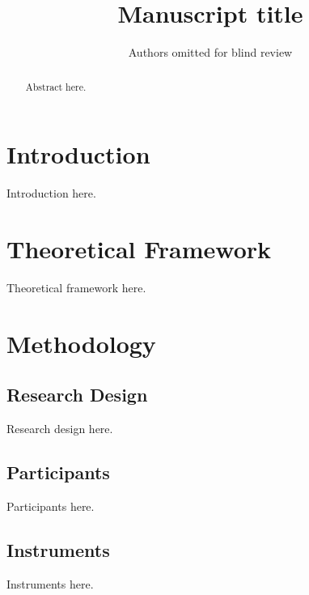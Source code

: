 \documentclass[Afour,times]{sagej}
\begin{document}

\title{Manuscript title}

\author{Authors omitted for blind review}




\begin{abstract}
Abstract here.
\end{abstract}


\maketitle

\section{Introduction}
\label{sec:intro}
Introduction here.

\section{Theoretical Framework}
\label{sec:framework}
Theoretical framework here.

\section{Methodology}
\label{sec:method}
\subsection{Research Design}
Research design here.

\subsection{Participants}
Participants here.

\subsection{Instruments}
Instruments here.
\end{document}
